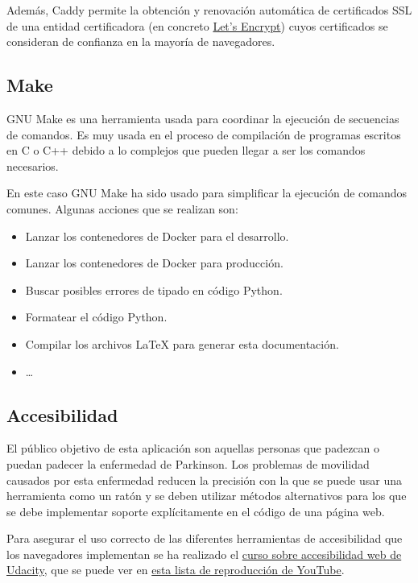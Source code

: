 Además, Caddy permite la obtención y renovación automática de certificados SSL
de una entidad certificadora (en concreto \href{https://letsencrypt.org/}{Let's
Encrypt}) cuyos certificados se consideran de confianza en la mayoría de
navegadores.

\subsection{Make}

GNU Make es una herramienta usada para coordinar la ejecución de secuencias de
comandos. Es muy usada en el proceso de compilación de programas escritos en C o
C++ debido a lo complejos que pueden llegar a ser los comandos necesarios.

En este caso GNU Make ha sido usado para simplificar la ejecución de comandos
comunes. Algunas acciones que se realizan son:

\begin{itemize}
    \item Lanzar los contenedores de Docker para el desarrollo.
    \item Lanzar los contenedores de Docker para producción.
    \item Buscar posibles errores de tipado en código Python.
    \item Formatear el código Python.
    \item Compilar los archivos \LaTeX{} para generar esta documentación.
    \item \dots
\end{itemize}

\subsection{Accesibilidad}

El público objetivo de esta aplicación son aquellas personas que padezcan o
puedan padecer la enfermedad de Parkinson. Los problemas de movilidad causados
por esta enfermedad reducen la precisión con la que se puede usar una
herramienta como un ratón y se deben utilizar métodos alternativos para los que
se debe implementar soporte explícitamente en el código de una página web.

Para asegurar el uso correcto de las diferentes herramientas de accesibilidad
que los navegadores implementan se ha realizado el
\href{https://www.udacity.com/course/web-accessibility--ud891}{curso sobre
accesibilidad web de Udacity}, que se puede ver en
\href{https://www.youtube.com/playlist?list=PLcJAkgdenpsci0IJziU4bCk3dTQLpJU7R}{esta
lista de reproducción de YouTube}.

